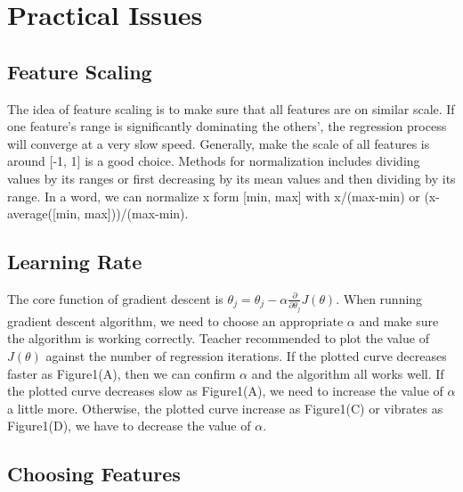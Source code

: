 \documentclass{article}
\begin{document}
\section{Practical Issues}
\subsection{Feature Scaling}
The idea of feature scaling is to make sure that all features are on similar scale. If one feature's range is significantly dominating the others', the regression process will converge at a very slow speed. Generally, make the scale of all features is around [-1, 1] is a good choice. Methods for normalization includes dividing values by its ranges or first decreasing by its mean values and then dividing by its range. In a word, we can normalize x form [min, max] with x/(max-min) or (x-average([min, max]))/(max-min).
\subsection{Learning Rate}
The core function of gradient descent is $\theta_j =\theta_j - \alpha\frac{\partial}{\partial \theta_j}J(\theta)$. When running gradient descent algorithm, we need to choose an appropriate $\alpha$ and make sure the algorithm is working correctly. Teacher recommended to plot the value of $J(\theta)$ against the number of regression iterations. If the plotted curve decreases faster as Figure1(A), then we can confirm $\alpha$ and the algorithm all works well. If the plotted curve decreases slow as Figure1(A), we need to increase the value of $\alpha$ a little more. Otherwise, the plotted curve increase as Figure1(C) or vibrates as Figure1(D), we have to decrease the value of $\alpha$.
\subsection{Choosing Features}
\end{document}

